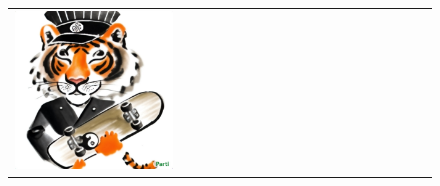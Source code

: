 \begin{figure}[ht!]
\begin{adjustwidth}{-0.8in}{-0.5in}
\begin{tabular}{cccccccccccccccccccc}
\multicolumn{2}{c}{\includegraphics[width=\threebythreecolwidth\textwidth]{figures/cherries/tiger9.jpg}} &&


\end{tabular}
\end{adjustwidth}
\end{figure}
